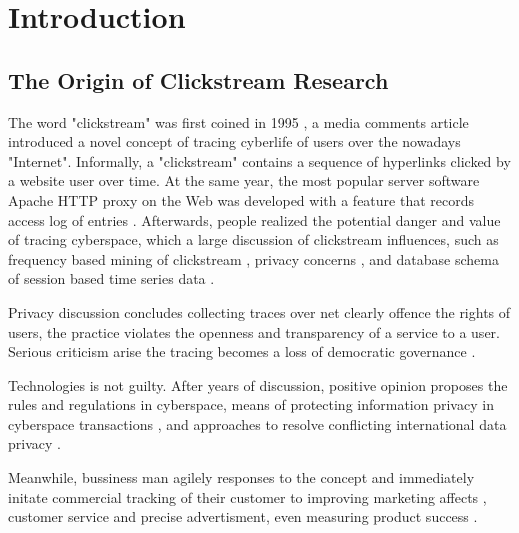 \section{Introduction}
\label{ch:intro}

\subsection{The Origin of Clickstream Research}



The word "clickstream" was first coined in 1995 \cite{friedman1995}, a media comments article 
introduced a novel concept of tracing cyberlife of users over the nowadays "Internet". Informally,
a "clickstream" contains a sequence of hyperlinks clicked by a website user over time.
At the same year, the most popular server software Apache HTTP proxy on the Web was developed with a feature
that records access log of entries \cite{apache1995http}.
Afterwards, people realized the potential danger and value of tracing cyberspace, which  a
large discussion of clickstream influences, such as frequency based mining of clickstream \cite{brodwin1995},
privacy concerns \cite{reidenberg1996governing}, and database schema of session based time series data \cite{courtheoux2000database}.


Privacy discussion concludes collecting traces over net clearly offence the rights of users,
the practice violates the openness and transparency of a service to a user.
Serious criticism arise the tracing becomes a loss of democratic governance \cite{gindin1997lost}.

Technologies is not guilty. After years of discussion, positive opinion proposes the rules 
\cite{reidenberg1996governing} and regulations \cite{skok1999establishing} in cyberspace,
means of protecting information privacy in cyberspace transactions \cite{kang1997information},
and approaches to resolve conflicting international data privacy \cite{reidenberg1999resolving}.

Meanwhile, bussiness man agilely responses to the concept and immediately initate 
commercial tracking of their customer to improving marketing affects \cite{novick1995}, 
customer service and precise advertisment\cite{reagle1999platform, bucklin2000sticky}, 
even measuring product success \cite{schonberg2000measuring}.

